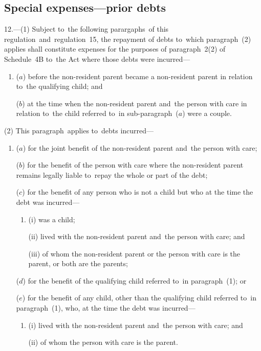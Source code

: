 \documentclass[12pt,a4paper]{article}
\begin{document}

\subsection[12. Special expenses—prior debts]{Special expenses—prior debts}

12.---(1)  Subject to~the following parargaphs~of this regulation~and~regulation~15, the repayment of debts to~which paragraph~(2) applies shall constitute expenses for the purposes of paragraph~2(2) of Schedule~4B to~the Act where those debts were incurred—
\begin{enumerate}\item[]
($a$) before the non-resident parent became a non-resident parent in relation to~the qualifying child; and

($b$) at the time when the non-resident parent and~the person with care in relation to~the child referred to~in sub-paragraph~($a$)  were a couple.
\end{enumerate}

(2) This paragraph~applies to~debts incurred—
\begin{enumerate}\item[]
($a$) for the joint benefit of the non-resident parent and~the person with care;

($b$) for the benefit of the person with care where the non-resident parent remains legally liable to~repay the whole or part of the debt;

($c$) for the benefit of any person who is not a child but who at the time the debt was incurred—
\begin{enumerate}\item[]
(i) was a child;

(ii) lived with the non-resident parent and~the person with care; and

(iii) of whom the non-resident parent or the person with care is the parent, or both are the parents;
\end{enumerate}

($d$) for the benefit of the qualifying child referred to~in paragraph~(1); or

($e$) for the benefit of any child, other than the qualifying child referred to~in paragraph~(1), who, at the time the debt was incurred—
\begin{enumerate}\item[]
(i) lived with the non-resident parent and~the person with care; and

(ii) of whom the person with care is the parent.
\end{enumerate}
\end{enumerate}
\end{document}
